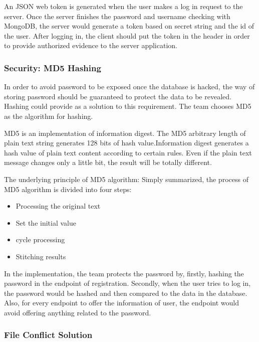 \documentclass{article}
\begin{document}
An JSON web token is generated when the user makes a log in request to the server. Once the server finishes the password and username checking with MongoDB, the server would generate a token based on secret string and the id of the user. After logging in, the client should put the token in the header in order to provide authorized evidence to the server application. 

\subsubsection{Security: MD5 Hashing}

In order to avoid password to be exposed once the database is hacked, the way of storing password should be guaranteed to protect the data to be revealed. Hashing could provide as a solution to this requirement. The team chooses MD5 as the algorithm for hashing. 

 MD5 is an implementation of information digest. The MD5 arbitrary length of plain text string generates 128 bits of hash value.Information digest generates a hash value of plain text content according to certain rules. Even if the plain text message changes only a little bit, the result will be totally different.

The underlying principle of MD5 algorithm:
Simply summarized, the process of MD5 algorithm is divided into four steps: 
\begin{itemize}
 
\item Processing the original text
\item Set the initial value
\item cycle processing
\item Stitching results

\end{itemize}

In the implementation, the team protects the password by, firstly, hashing the password in the endpoint of registration. Secondly, when the user tries to log in, the password would be hashed and then compared to the data in the database. Also, for every endpoint to offer the information of user, the endpoint would avoid offering anything related to the password.

\subsubsection{File Conflict Solution}
\end{document}
